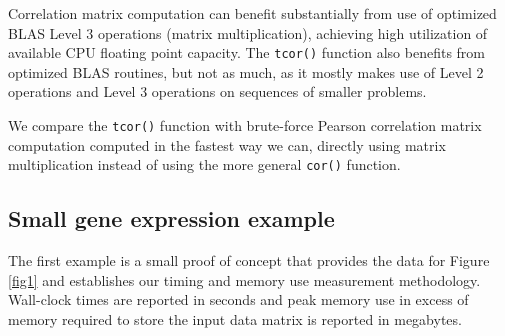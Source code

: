 \documentclass{article}
\numberwithin{algorithmctr}{section}
\begin{document}
Correlation matrix computation can benefit substantially from use of optimized
BLAS Level 3 operations (matrix multiplication), achieving high utilization of
available CPU floating point capacity. The {\tt tcor()} function also benefits
from optimized BLAS routines, but not as much, as it mostly makes use of Level
2 operations and Level 3 operations on sequences of smaller problems.

We compare the {\tt tcor()} function with brute-force Pearson correlation
matrix computation computed in the fastest way we can, directly using matrix
multiplication instead of using the more general {\tt cor()} function.

\subsection{Small gene expression example}

The first example is a small proof of concept that provides the data for Figure
\ref{fig1} and establishes our timing and memory use measurement methodology.
Wall-clock times are reported in seconds and peak memory use in excess of
memory required to store the input data matrix is reported in megabytes.
\end{document}
